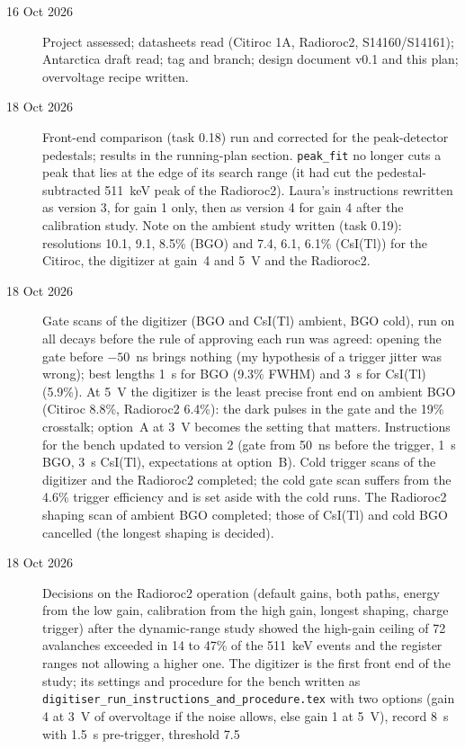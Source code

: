 \documentclass[11pt]{article}
\newcommand{\code}[1]{\texttt{#1}}
\newcommand{\us}{\textmu s\xspace}
\newcommand{\csitl}{CsI(Tl)\xspace}
\begin{document}
\begin{description}
\item[16 Oct 2026] Project assessed; datasheets read (Citiroc 1A, Radioroc2,
  S14160/S14161); Antarctica draft read; tag and branch; design document
  v0.1 and this plan; overvoltage recipe written.
\item[18 Oct 2026] Front-end comparison (task 0.18) run and corrected for
  the peak-detector pedestals; results in the running-plan section.
  \code{peak\_fit} no longer cuts a peak that lies at the edge of its search
  range (it had cut the pedestal-subtracted 511~keV peak of the
  Radioroc2). Laura's instructions rewritten as version 3, for gain 1 only, then as
  version 4 for gain 4 after the calibration study. Note on the ambient
  study written (task 0.19): resolutions 10.1, 9.1, 8.5\% (BGO) and 7.4,
  6.1, 6.1\% (\csitl) for the Citiroc, the digitizer at gain~4 and 5~V and
  the Radioroc2.
\item[18 Oct 2026] Gate scans of the digitizer (BGO and \csitl ambient,
  BGO cold), run on all decays before the rule of approving each run was
  agreed: opening the gate before $-50$~ns brings nothing (my hypothesis of a
  trigger jitter was wrong); best lengths 1~\us for BGO (9.3\% FWHM) and
  3~\us for \csitl (5.9\%). At 5~V the digitizer is the least precise front
  end on ambient BGO (Citiroc 8.8\%, Radioroc2 6.4\%): the dark pulses in the
  gate and the 19\% crosstalk; option~A at 3~V becomes the setting that
  matters. Instructions for the bench updated to version 2 (gate from 50~ns
  before the trigger, 1~\us BGO, 3~\us \csitl, expectations at option~B).
  Cold trigger scans of the digitizer and the Radioroc2 completed; the cold
  gate scan suffers from the 4.6\% trigger efficiency and is set aside with
  the cold runs. The Radioroc2 shaping scan of ambient BGO completed; those
  of \csitl and cold BGO cancelled (the longest shaping is decided).
\item[18 Oct 2026] Decisions on the Radioroc2 operation (default gains,
  both paths, energy from the low gain, calibration from the high gain,
  longest shaping, charge trigger) after the dynamic-range study showed the
  high-gain ceiling of 72 avalanches exceeded in 14 to 47\% of the 511~keV
  events and the register ranges not allowing a higher one. The digitizer
  is the first front end of the study; its settings and procedure for the
  bench written as \code{digitiser\_run\_instructions\_and\_procedure.tex}
  with two options (gain 4 at 3~V of overvoltage if the noise allows, else
  gain 1 at 5~V), record 8~\us with 1.5~\us pre-trigger, threshold 7.5

\end{description}
\end{document}
